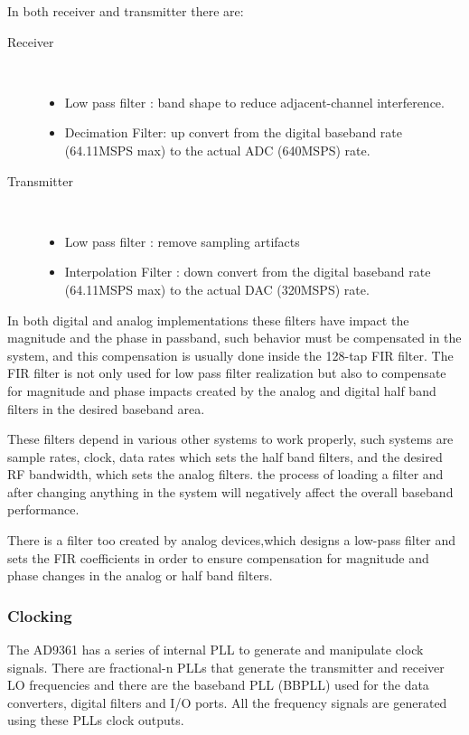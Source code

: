 In both receiver and transmitter there are:
\begin{description}
	\item[Receiver] \hfill \\
	\begin{itemize}
		\item Low pass filter : band shape to reduce adjacent-channel interference.
		\item Decimation Filter: up convert from the digital baseband rate (64.11MSPS max) to the actual ADC (640MSPS) rate.
	\end{itemize}
	\item[Transmitter] \hfill \\
\begin{itemize}
		\item Low pass filter : remove sampling artifacts
		\item Interpolation Filter : down convert from the digital baseband rate (64.11MSPS max) to the actual DAC (320MSPS) rate.
	\end{itemize}
\end{description}

In both digital and analog implementations these filters have impact the
magnitude and the phase in passband, such behavior must be compensated in the
system, and this compensation is usually done inside the 128-tap FIR filter. The
FIR filter is not only used for low pass filter realization but also to
compensate for magnitude and phase impacts created by the analog and digital
half band filters in the desired baseband area.

These filters depend in various other systems to work properly, such systems are
sample rates, clock, data rates which sets the half band filters, and the
desired RF bandwidth, which sets the analog filters. the process of loading a
filter and after changing anything in the system will negatively affect the
overall baseband performance.

There is a filter too created by analog devices,which designs a low-pass filter
and sets the FIR coefficients in order to ensure compensation for magnitude and
phase changes in the analog or half band filters.
\subsubsection{Clocking}

The AD9361 has a series of internal PLL to generate and manipulate clock
signals. There are fractional-n PLLs that generate the transmitter and receiver
LO frequencies and there are the baseband PLL (BBPLL) used for the data
converters, digital filters and I/O ports. All the frequency signals are
generated using these PLLs clock outputs.

